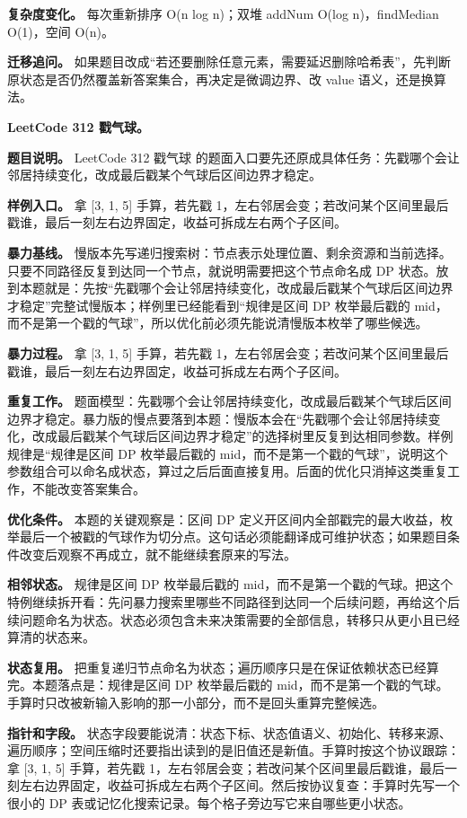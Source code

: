 \textbf{复杂度变化。} 每次重新排序 O(n log n)；双堆 addNum O(log n)，findMedian O(1)，空间 O(n)。

\textbf{迁移追问。} 如果题目改成“若还要删除任意元素，需要延迟删除哈希表”，先判断原状态是否仍然覆盖新答案集合，再决定是微调边界、改 value 语义，还是换算法。

\noindent\textbf{LeetCode 312 戳气球。}

\textbf{题目说明。} LeetCode 312 戳气球 的题面入口要先还原成具体任务：先戳哪个会让邻居持续变化，改成最后戳某个气球后区间边界才稳定。

\textbf{样例入口。} 拿 [3, 1, 5] 手算，若先戳 1，左右邻居会变；若改问某个区间里最后戳谁，最后一刻左右边界固定，收益可拆成左右两个子区间。

\textbf{暴力基线。} 慢版本先写递归搜索树：节点表示处理位置、剩余资源和当前选择。只要不同路径反复到达同一个节点，就说明需要把这个节点命名成 DP 状态。放到本题就是：先按“先戳哪个会让邻居持续变化，改成最后戳某个气球后区间边界才稳定”完整试慢版本；样例里已经能看到“规律是区间 DP 枚举最后戳的 mid，而不是第一个戳的气球”，所以优化前必须先能说清慢版本枚举了哪些候选。

\textbf{暴力过程。} 拿 [3, 1, 5] 手算，若先戳 1，左右邻居会变；若改问某个区间里最后戳谁，最后一刻左右边界固定，收益可拆成左右两个子区间。

\textbf{重复工作。} 题面模型：先戳哪个会让邻居持续变化，改成最后戳某个气球后区间边界才稳定。暴力版的慢点要落到本题：慢版本会在“先戳哪个会让邻居持续变化，改成最后戳某个气球后区间边界才稳定”的选择树里反复到达相同参数。样例规律是“规律是区间 DP 枚举最后戳的 mid，而不是第一个戳的气球”，说明这个参数组合可以命名成状态，算过之后后面直接复用。后面的优化只消掉这类重复工作，不能改变答案集合。

\textbf{优化条件。} 本题的关键观察是：区间 DP 定义开区间内全部戳完的最大收益，枚举最后一个被戳的气球作为切分点。这句话必须能翻译成可维护状态；如果题目条件改变后观察不再成立，就不能继续套原来的写法。

\textbf{相邻状态。} 规律是区间 DP 枚举最后戳的 mid，而不是第一个戳的气球。把这个特例继续拆开看：先问暴力搜索里哪些不同路径到达同一个后续问题，再给这个后续问题命名为状态。状态必须包含未来决策需要的全部信息，转移只从更小且已经算清的状态来。

\textbf{状态复用。} 把重复递归节点命名为状态；遍历顺序只是在保证依赖状态已经算完。本题落点是：规律是区间 DP 枚举最后戳的 mid，而不是第一个戳的气球。手算时只改被新输入影响的那一小部分，而不是回头重算完整候选。

\textbf{指针和字段。} 状态字段要能说清：状态下标、状态值语义、初始化、转移来源、遍历顺序；空间压缩时还要指出读到的是旧值还是新值。手算时按这个协议跟踪：拿 [3, 1, 5] 手算，若先戳 1，左右邻居会变；若改问某个区间里最后戳谁，最后一刻左右边界固定，收益可拆成左右两个子区间。然后按协议复查：手算时先写一个很小的 DP 表或记忆化搜索记录。每个格子旁边写它来自哪些更小状态。

